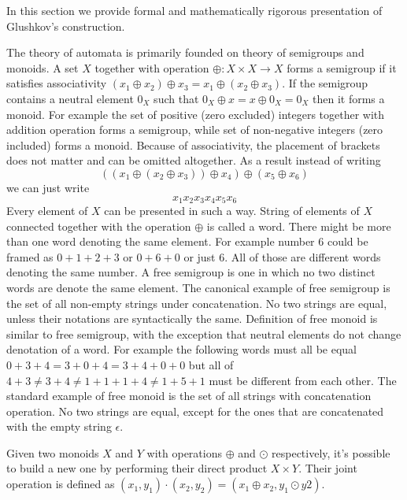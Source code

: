 In this section we provide formal and mathematically rigorous presentation of Glushkov's construction. 

The theory of automata is primarily founded on theory of semigroups and monoids. A set $X$ together with operation $\oplus:X\times X \rightarrow X$ forms a semigroup if it satisfies associativity $(x_1 \oplus x_2) \oplus x_3= x_1 \oplus (x_2 \oplus x_3)$. If the semigroup contains a neutral element $0_X$ such that $0_X \oplus x = x \oplus 0_X = 0_X$ then it forms a monoid. For example the set of positive (zero excluded) integers together with addition operation forms a semigroup, while set of non-negative integers (zero included) forms a monoid. Because of associativity, the placement of brackets does not matter and can be omitted  altogether. As a result instead of writing 
\[
((x_1\oplus (x_2 \oplus x_3)) \oplus x_4)\oplus (x_5\oplus x_6)
\]
we can just write 
\[
x_1 x_2  x_3 x_4 x_5 x_6
\]
Every element of $X$ can be presented in such a way.  String of elements of $X$ connected together with the operation $\oplus$ is called a word. There might be more than one word denoting the same element. For example number $6$ could be framed as $0+1+2+3$ or $0+6+0$ or just $6$. All of those are different words denoting the same number. A free semigroup is one in which no two distinct words are denote the same element. The canonical example of free semigroup is the set of all non-empty strings under concatenation. No two strings are equal, unless their notations are syntactically the same. Definition of free monoid is similar to free semigroup, with the exception that neutral elements do not change denotation of a word. For example the following words must all be equal $0+3+4=3+0+4=3+4+0+0$ but all of $4+3 \ne 3+4 \ne 1+1+1+4 \ne 1 + 5 + 1$ must be different from each other. The standard example of free monoid is the set of all strings with concatenation operation. No two strings are equal, except for the ones that are concatenated with the empty string $\epsilon$. 

Given two monoids $X$ and $Y$ with operations $\oplus$ and $\odot$ respectively, it's possible to build a new one by performing their direct product $X \times Y$. Their joint operation is defined as $(x_1,y_1)\cdot(x_2,y_2) = (x_1 \oplus x_2, y_1 \odot y2)$.


